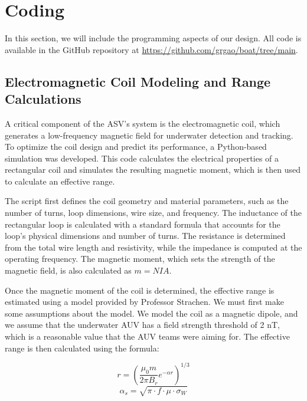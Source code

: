 \section{Coding}
\label{sec:Coding}

In this section, we will include the programming aspects of our design. All code is available in the GitHub repository at \url{https://github.com/grgao/boat/tree/main}. 

\subsection{Electromagnetic Coil Modeling and Range Calculations}
A critical component of the ASV's system is the electromagnetic coil, which generates a low-frequency magnetic field for underwater detection and tracking. To optimize the coil design and predict its performance, a Python-based simulation was developed. This code calculates the electrical properties of a rectangular coil and simulates the resulting magnetic moment, which is then used to calculate an effective range. 

The script first defines the coil geometry and material parameters, such as the number of turns, loop dimensions, wire size, and frequency. The inductance of the rectangular loop is calculated with a standard formula that accounts for  the loop's physical dimensions and number of turns. The resistance is determined from the total wire length and resistivity, while the impedance is computed at the operating frequency. The magnetic moment, which sets the strength of the magnetic field, is also calculated as $m = NIA$.

Once the magnetic moment of the coil is determined, the effective range is estimated using a model provided by Professor Strachen. We must first make some assumptions about the model. We model the coil as a magnetic dipole, and we assume that the underwater AUV has a field strength threshold of 2 nT, which is a reasonable value that the AUV teams were aiming for. The effective range is then calculated using the formula:

\begin{equation}
r = \left( \frac{\mu_0 m}{2 \pi B_r} e^{-\alpha r} \right)^{1/3}
\end{equation}
\begin{equation}
\alpha_s = \sqrt{\pi \cdot f \cdot \mu \cdot \sigma_W}
\end{equation}

